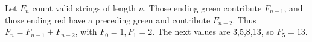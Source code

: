 Let $ F_n $ count valid strings of length $ n $. Those ending green contribute $ F_{n-1}$, and those ending red have a preceding green and contribute $ F_{n-2}$. Thus $ F_n=F_{n-1}+F_{n-2}$, with $ F_0=1,F_1=2 $. The next values are 3,5,8,13, so $\boxed{F_5=13}$.
